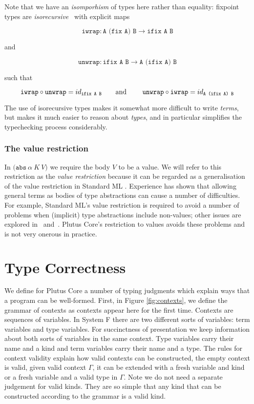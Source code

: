 \documentclass[a4paper]{article}
\newcommand{\keyword}[1]{\texttt{#1}}
\newcommand{\construct}[1]{\texttt{(} #1 \texttt{)}}
\newcommand{\abs}[3]{\construct{\keyword{abs} ~ #1 ~ #2 ~ #3}}
\begin{document}
Note that we have an \textit{isomporhism} of types here rather than
equality: fixpoint types are
\textit{isorecursive}~\citep[20.2]{Pierce:TAPL} with explicit maps

$$
\texttt{iwrap} : \texttt{A (fix A) B} \rightarrow \texttt{ifix A B}
$$

\noindent and

$$
\texttt{unwrap} : \texttt{ifix A B} \rightarrow  \texttt{A (ifix A) B}
$$

\noindent such that

$$
\texttt{iwrap} \circ \texttt{unwrap} = id_{ \texttt{ifix A B}}
\mbox{\qquad and \qquad}
\texttt{unwrap} \circ \texttt{iwrap} = id_{ \texttt{A (ifix A) B}}
$$

\noindent The use of isorecursive types makes it somewhat more difficult to
write \textit{terms}, but makes it much easier to reason about
\textit{types}, and in particular simplifies the typechecking process
considerably.


\subsubsection{The value restriction}
In $\abs{\alpha}{K}{V}$ we require the body $V$ to be a value. We will
refer to this restriction as the \textit{value restriction} because it
can be regarded as a generalisation of the value restriction in
Standard ML \citep[22.7]{Pierce:TAPL}. Experience has shown that
allowing general terms as bodies of type abstractions can cause a
number of difficulties.  For example, Standard ML's value restriction
is required to avoid a number of problems when (implicit) type
abstractions include non-values; other issues are explored
in~\citep[2.4]{Ahmed:2017}
and~\citep[7.4.1]{Pitts:typed-operational-reasoning}. Plutus Core's
restriction to values avoids these problems and is not very onerous in
practice.
  
\section{Type Correctness}

We define for Plutus Core a number of typing judgments which explain
ways that a program can be well-formed. First, in Figure
\ref{fig:contexts}, we define the grammar of contexts as
contexts appear here for the first time. Contexts are sequences of
variables. In System F there are two different sorts of variables:
term variables and type variables. For succinctness of presentation we
keep information about both sorts of variables in the same
context. Type variables carry their name and a kind and term variables
carry their name and a type. The rules for context validity explain
how valid contexts can be constructed, the empty context is valid,
given valid context $\Gamma$, it can be extended with a fresh variable
and kind or a fresh variable and a valid type in $\Gamma$. Note we do
not need a separate judgement for valid kinds. They are so simple that
any kind that can be constructed according to the grammar is a valid
kind.
\end{document}
